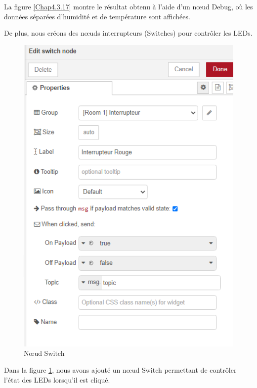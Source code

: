 La figure \ref{Chap4.3.17} montre le résultat obtenu à l'aide d'un nœud Debug, où les données séparées d'humidité et de température sont affichées.

De plus, nous créons des nœuds interrupteurs (Switches) pour contrôler les LEDs.


\begin{figure}[H]
\centering
\includegraphics[width=13cm]{Images/Node-6.png}
\caption{Nœud Switch}
\label{Chap4.3.18}
\end{figure}

Dans la figure \ref{Chap4.3.18}, nous avons ajouté un nœud Switch permettant de contrôler l'état des LEDs lorsqu'il est cliqué.


